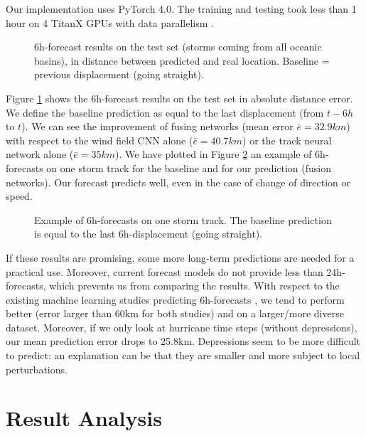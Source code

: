 Our implementation uses PyTorch 4.0.  The training and testing took less than 1 hour on 4 TitanX GPUs with data parallelism \cite{krizhevsky2014one}.




\begin{figure}
	\begin{center}
		\hsize {}
	\end{center}
	\caption{6h-forecast results on the test set (storms coming from all oceanic basins), in distance between predicted and real location. Baseline = previous displacement (going straight).}
	\label{fig:boxplots}
\end{figure}

Figure \ref{fig:boxplots} shows the 6h-forecast results on the test set in absolute distance error. We define the baseline prediction as equal to the last displacement (from $t-6h$ to $t$). We can see the improvement of fusing networks (mean error $\bar{e}=32.9km$) with respect to the wind field CNN alone ($\bar{e}=40.7km$) or the track neural network alone ($\bar{e}=35km$).
We have plotted in Figure \ref{fig:track} an example of 6h-forecasts on one storm track for the baseline and for our prediction (fusion networks). Our forecast predicts well, even in the case of change of direction or speed.


\begin{figure}
	\begin{center}
		\hsize {}
	\end{center}
	\caption{Example of 6h-forecasts on one storm track. The baseline prediction is equal to the last 6h-displacement (going straight).}
	\label{fig:track}
\end{figure}


If these results are promising, some more long-term predictions are needed for a practical use. Moreover, current forecast models do not provide less than 24h-forecasts, which prevents us from comparing the results. With respect to the existing machine learning studies predicting 6h-forecasts \cite{liberge2011prevision,moradi2016sparse}, we tend to perform better (error larger than 60km for both studies) and on a larger/more diverse dataset. Moreover, if we only look at hurricane time steps (without depressions), our mean prediction error drops to 25.8km. Depressions seem to be more difficult to predict: an explanation can be that they are smaller and more subject to local perturbations.

\section{Result Analysis}

